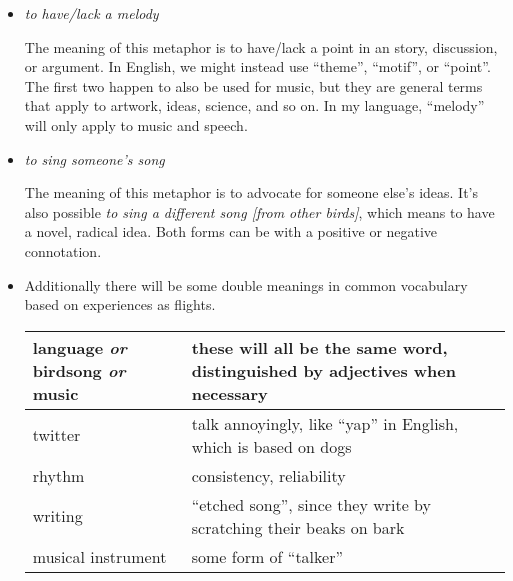 \documentclass[12pt]{article}
\begin{document}
    \begin{itemize}
        \item
        \textit{to have/lack a melody}

        The meaning of this metaphor is to have/lack a point in an story, discussion, or argument.
        In English, we might instead use ``theme'', ``motif'', or ``point''.
        The first two happen to also be used for music,
        but they are general terms that apply to artwork, ideas, science, and so on.
        In my language, ``melody'' will only apply to music and speech.

        \item
        \textit{to sing someone's song}

        The meaning of this metaphor is to advocate for someone else's ideas.
        It's also possible \textit{to sing a different song [from other birds]},
        which means to have a novel, radical idea.
        Both forms can be with a positive or negative connotation.

        \item
        Additionally there will be some double meanings in common vocabulary based on experiences as flights.

        \begin{center}
            \begin{tabular}{b{5em} b{27em}}
                \hline
                language \textit{or} birdsong \textit{or} music
                & these will all be the same word, distinguished by adjectives when necessary \\
                \hline
                twitter
                & talk annoyingly, like ``yap'' in English, which is based on dogs            \\
                \hline
                rhythm
                & consistency, reliability                                                    \\
                \hline
                writing
                & ``etched song'', since they write by scratching their beaks on bark         \\
                \hline
                musical \quad instrument
                & some form of ``talker''                                                     \\
                \hline
            \end{tabular}
        \end{center}
    \end{itemize}
\end{document}
